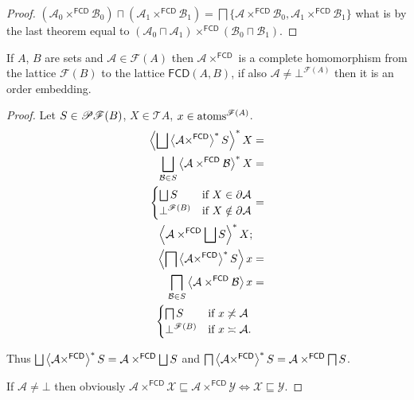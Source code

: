 \begin{proof}
$(\mathcal{A}_{0}\times^{\mathsf{FCD}}\mathcal{B}_{0})\sqcap(\mathcal{A}_{1}
\times^{\mathsf{FCD}}\mathcal{B}_{1})=\bigsqcap\{\mathcal{A}\times^{\mathsf{FCD
}}\mathcal{B}_{0},\mathcal{A}_{1}\times^{\mathsf{FCD}}\mathcal{B}_{1}\}$
what is by the last theorem equal to
$(\mathcal{A}_{0}\sqcap\mathcal{A}_{1})\times^{\mathsf{FCD}}(\mathcal{B}_{0}
\sqcap\mathcal{B}_{1})$.\end{proof}
\begin{thm}
If $A$, $B$ are sets and $\mathcal{A}\in\mathscr{F}(A)$ then
$\mathcal{A}\times^{\mathsf{FCD}}$
is a complete homomorphism from the lattice $\mathscr{F}(B)$ to the
lattice $\mathsf{FCD}(A,B)$, if also $\mathcal{A}\ne\bot^{\mathscr{F}(A)}$
then it is an order embedding.\end{thm}
\begin{proof}
Let $S\in\mathscr{P}\mathscr{F}(B)$, $X\in\mathscr{T}A$,
$x\in\operatorname{atoms}^{\mathscr{F}(A)}$.
\begin{align*}
\rsupfun{\bigsqcup\rsupfun{\mathcal{A}\times^{\mathsf{FCD}}}S}X & =\\
\bigsqcup_{\mathcal{B}\in
S}\rsupfun{\mathcal{A}\times^{\mathsf{FCD}}\mathcal{B}}X & =\\
\begin{cases}
\bigsqcup S & \text{if }X\in\corestar\mathcal{A}\\
\bot^{\mathscr{F}(B)} & \text{if }X\notin\corestar\mathcal{A}
\end{cases} & =\\
\rsupfun{\mathcal{A}\times^{\mathsf{FCD}}\bigsqcup S}X;\\
\supfun{\bigsqcap\rsupfun{\mathcal{A}\times^{\mathsf{FCD}}}S}x & =\\
\bigsqcap_{\mathcal{B}\in
S}\supfun{\mathcal{A}\times^{\mathsf{FCD}}\mathcal{B}}x & =\\
\begin{cases}
\bigsqcap S & \text{if }x\nasymp\mathcal{A}\\
\bot^{\mathscr{F}(B)} & \text{if }x\asymp\mathcal{A}.
\end{cases}
\end{align*}


Thus
$\bigsqcup\rsupfun{\mathcal{A}\times^{\mathsf{FCD}}}S=\mathcal{A}\times^{\mathsf
{FCD}}\bigsqcup S$
and
$\bigsqcap\left\langle \mathcal{A}\times^{\mathsf{FCD}}\right\rangle ^{\ast}S=\mathcal{A}\times^{\mathsf
{FCD}}\bigsqcap S$.

If $\mathcal{A}\ne\bot$ then obviously
$\mathcal{A}\times^{\mathsf{FCD}}\mathcal{X}\sqsubseteq\mathcal{A}\times^{\mathsf{FCD}}\mathcal{Y} \Leftrightarrow
\mathcal{X}\sqsubseteq\mathcal{Y}$.
\end{proof}
